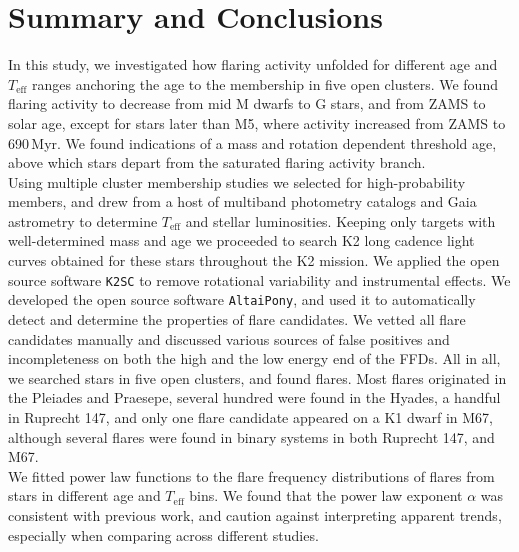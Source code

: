 \documentclass{aa}
\begin{document}
\section{Summary and Conclusions}
\label{sec:summary}
In this study, we investigated how flaring activity unfolded for different age and $T_\mathrm{eff}$ ranges anchoring the age to the membership in five open clusters. We found flaring activity to decrease from mid M dwarfs to G stars, and from ZAMS to solar age, except for stars later than M5, where activity increased from ZAMS to 690\,Myr. We found indications of a mass and rotation dependent threshold age, above which stars depart from the saturated flaring activity branch.
\\
Using multiple cluster membership studies we selected for high-probability members, and drew from a host of multiband photometry catalogs and Gaia astrometry to determine $T_\mathrm{eff}$ and stellar luminosities. Keeping only targets with well-determined mass and age we proceeded to search K2 long cadence light curves obtained for these stars throughout the K2 mission. We applied the open source software \texttt{K2SC} to remove rotational variability and instrumental effects. We developed the open source software \texttt{AltaiPony}, and used it to automatically detect and determine the properties of flare candidates. We vetted all flare candidates manually and discussed various sources of false positives and incompleteness on both the high and the low energy end of the FFDs. All in all, we searched stars in five open clusters, and found flares. Most flares originated in the Pleiades and Praesepe, several hundred were found in the Hyades, a handful in Ruprecht 147, and only one flare candidate appeared on a K1 dwarf in M67, although several flares were found in binary systems in both Ruprecht 147, and M67.
\\
We fitted power law functions to the flare frequency distributions of flares from stars in different age and $T_\mathrm{eff}$ bins. We found that the power law exponent $\alpha$ was consistent with previous work, and caution against interpreting apparent trends, especially when comparing across different studies.
\\
\end{document}
